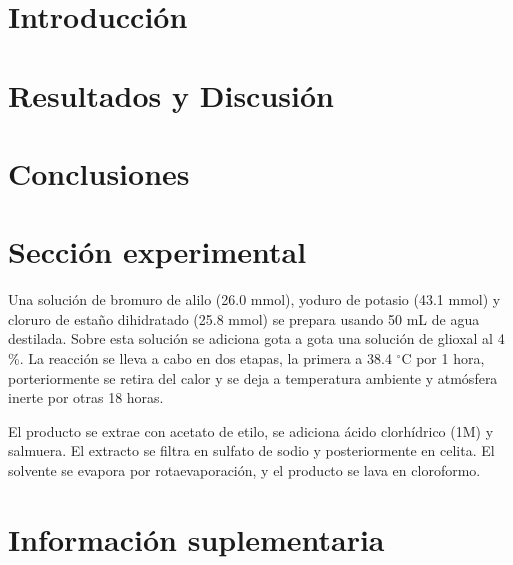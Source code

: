 \documentclass[fleqn,10pt]{SelfArx}
\begin{document}
\flushbottom %

\maketitle %


\thispagestyle{empty} %




\section*{Introducci\'on} %

\section{Resultados y Discusi\'on}

\section{Conclusiones}
\section{Secci\'on experimental}
Una soluci\'on de bromuro de alilo (26.0 mmol), yoduro de potasio (43.1 mmol) y cloruro de esta\~no dihidratado (25.8 mmol) se prepara usando 50 mL de agua destilada. Sobre esta soluci\'on se adiciona gota a gota una soluci\'on de glioxal al 4 \%. La reacci\'on se lleva a cabo en dos etapas, la primera a 38.4 $^\circ$C por 1 hora, porteriormente se retira del calor y se deja a temperatura ambiente y atm\'osfera inerte por otras 18 horas.

El producto se extrae con acetato de etilo, se adiciona \'acido clorh\'idrico (1M) y salmuera. El extracto se filtra en sulfato de sodio y posteriormente en celita. El solvente se evapora por rotaevaporaci\'on, y el producto se lava en cloroformo.




\newpage
\onecolumn
\section{Informaci\'on suplementaria}\label{sec: complementaria}
\end{document}
